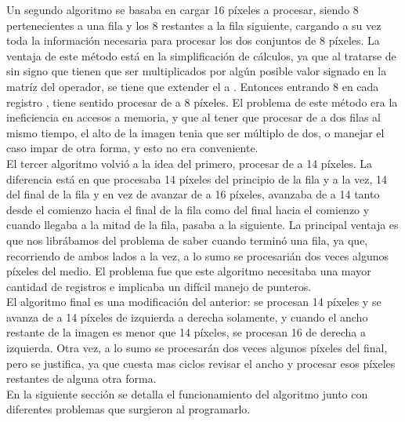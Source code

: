 Un segundo algoritmo se basaba en cargar 16 p\'ixeles a procesar,
siendo 8 pertenecientes a una fila y los 8 restantes a la fila siguiente, cargando a su vez toda la informaci\'on necesaria para procesar los dos conjuntos de 8 p\'ixeles. La ventaja de este m\'etodo est\'a en la simplificaci\'on de c\'alculos, ya que al tratarse de  sin signo que tienen que ser multiplicados por alg\'un posible valor signado en la matr\'iz del operador, se tiene que extender el  a . Entonces entrando 8  en cada registro , tiene sentido procesar de a 8 p\'ixeles.
El problema de este m\'etodo era la ineficiencia en accesos a memoria, y que al tener que procesar de a dos filas al mismo tiempo, el alto de la imagen tenia que ser m\'ultiplo de dos, o manejar el caso impar de otra forma, y esto no era conveniente. \\

El tercer algoritmo volvi\'o a la idea del primero, procesar de a 14 p\'ixeles. La diferencia est\'a en que procesaba 14 p\'ixeles del principio de la fila y a la vez, 14 del final de la fila y en vez de avanzar de a 16 p\'ixeles, avanzaba de a 14 tanto desde el comienzo hacia el final de la fila como del final hacia el comienzo y cuando llegaba a la mitad de la fila, pasaba a la siguiente.
La principal ventaja es que nos libr\'abamos del problema de saber cuando termin\'o una fila, ya que, recorriendo de ambos lados a la vez, a lo sumo se procesari\'an dos veces algunos p\'ixeles del medio. El problema fue que este algoritmo necesitaba una mayor cantidad de registros e implicaba un dif\'icil manejo de punteros. \\

El algoritmo final es una modificaci\'on del anterior: se procesan 14 p\'ixeles y se avanza de a 14 p\'ixeles de izquierda a derecha solamente, y cuando el ancho restante de la imagen es menor que 14 p\'ixeles, se procesan 16 de derecha a izquierda. Otra vez, a lo sumo se procesar\'an dos veces algunos p\'ixeles del final, pero se justifica, ya que cuesta mas ciclos revisar el ancho y procesar esos p\'ixeles restantes de alguna otra forma. \\

En la siguiente secci\'on se detalla el funcionamiento del algoritmo junto con diferentes problemas que surgieron al programarlo. \\

\pagebreak

